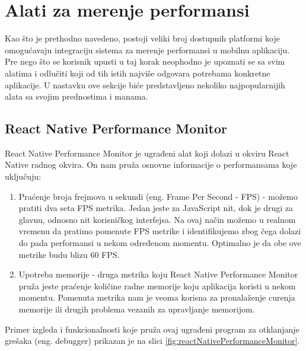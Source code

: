 \documentclass[12pt,oneside]{memoir}
\begin{document}
\section{Alati za merenje performansi}

Kao što je prethodno navedeno, postoji veliki broj dostupnih platformi koje omogućavaju integraciju sistema za merenje performansi u mobilnu aplikaciju. Pre nego što se korisnik upusti u taj korak neophodno je upoznati se sa svim alatima i odlučiti koji od tih istih najviše odgovara potrebama konkretne aplikacije. U nastavku ove sekcije biće predstavljeno nekoliko najpopularnijih alata sa svojim prednostima i manama.

\subsection{React Native Performance Monitor}

React Native Performance Monitor je ugrađeni alat koji dolazi u okviru React Native radnog okvira. On nam pruža osnovne informacije o performansama koje uključuju:

\begin{enumerate}
    \item Praćenje broja frejmova u sekundi (eng. Frame Per Second - FPS) - možemo pratiti dva seta FPS metrika. Jedan jeste za JavaScript nit, dok je drugi za glavnu, odnosno nit korisničkog interfejsa. Na ovaj način možemo u realnom vremenu da pratimo pomenute FPS metrike i identifikujemo zbog čega dolazi do pada performansi u nekom određenom momentu. Optimalno je da obe ove metrike budu blizu 60 FPS.
    \item Upotreba memorije - druga metrika koju React Native Performance Monitor pruža jeste praćenje količine radne memorije koju aplikacija koristi u nekom momentu. Pomenuta metrika nam je veoma korisna za pronalaženje curenja memorije ili drugih problema vezanih za upravljanje memorijom.
\end{enumerate}

Primer izgleda i funkcionalnosti koje pruža ovaj ugrađeni program za otklanjanje grešaka (eng. debugger) prikazan je na slici \ref{fig:reactNativePerformanceMonitor}.
\end{document}
